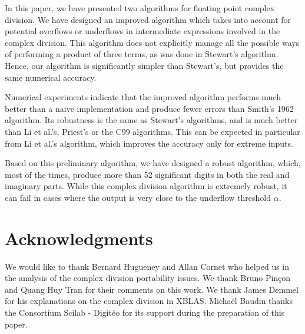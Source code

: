 \documentclass{paper}
\begin{document}
In this paper, we have presented two algorithms for floating point 
complex division. 
We have designed an improved algorithm which takes into account 
for potential overflows or underflows in intermediate expressions 
involved in the complex division. 
This algorithm does not explicitly manage all the 
possible ways of performing a product of three terms, as was 
done in Stewart's algorithm. 
Hence, our algorithm is significantly simpler than 
Stewart's, but provides the same numerical accuracy.

Numerical experiments indicate that the improved algorithm 
performs much better than a naive implementation and produce 
fewer errors than Smith's 1962 algorithm. 
Its robustness is the same as Stewart's algorithms, and 
is much better than Li et al.'s, Priest's or the C99 algorithms.
This can be expected in particular from Li et al.'s algorithm, 
which improves the accuracy only for extreme inputs.

Based on this preliminary algorithm, we have designed a 
robust algorithm, which, most of the times, 
produce more than 52 significant digits in both the real 
and imaginary parts. 
While this complex division algorithm is extremely 
robust, it can fail in cases where the output is 
very close to the underflow threshold $\alpha$.


\section*{Acknowledgments}

We would like to thank Bernard Hugueney and Allan Cornet who helped 
us in the analysis of the complex division portability issues. 
We thank Bruno Pin\c{c}on and Quang Huy Tran for their comments on this 
work. 
We thank James Demmel for his explanations on the complex 
division in XBLAS. 
Micha\"el Baudin thanks the Consortium Scilab - Digit\'eo for its 
support during the preparation of this paper.



\end{document}
